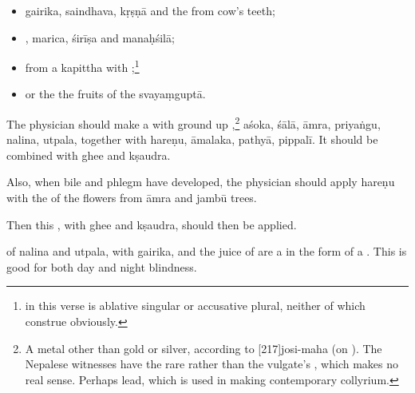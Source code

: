 \begin{translation}
\begin{itemize}
        \item \gls{gairika}, \gls{saindhava}, \gls{kṛṣṇā} 
        and the  from cow's teeth;
        
        \item {}, \gls{marica}, \gls{śirīṣa}
and \gls{manaḥśilā};
        
        \item 
         from a
        \gls{kapittha} with
        ;\footnote{ in this verse is 
        ablative 
        singular or accusative plural, neither of which construe obviously.}
        
        \item
        or the the fruits of the \gls{svayaṃguptā}.
    \end{itemize}
    
    \item [8]
    
    The physician should make a  with ground up
,\footnote{A metal other than gold or
    silver, according to [217]{josi-maha} (on ). 
    The Nepalese witnesses have the rare  rather than the
    vulgate's , which makes no real sense.  Perhaps lead,
    which is used in making contemporary collyrium.}
    \gls{aśoka},
    \gls{śālā},
    \gls{āmra},
    \gls{priyaṅgu},
    \gls{nalina},
    \gls{utpala}, 
    together with
    \gls{hareṇu},
    \gls{āmalaka},
    \gls{pathyā},
    \gls{pippalī}.  
    It should be combined with ghee and 
    \gls{kṣaudra}.
    
    
    \item[9--10]
    
    Also, when bile and phlegm have developed, the physician should apply
    \gls{hareṇu} with the  of the 
    flowers
    from \gls{āmra} and \gls{jambū} trees.
    
    Then this ,  with ghee and 
    \gls{kṣaudra},
    should then be applied.
    
    \item[10--11ab]
    
     of \gls{nalina} and \gls{utpala},
    with \gls{gairika}, and the juice of  are a 
    in the form of a  .  This is good for both day and night
    blindness.
    

\end{translation}
